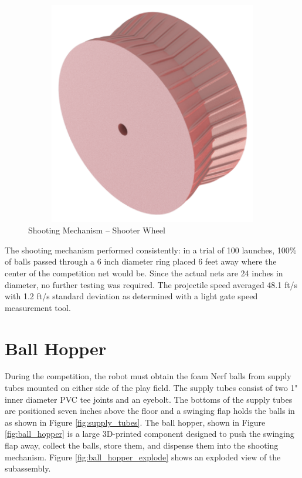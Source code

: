 \begin{figure}[H]   %
	\centering \includegraphics[width=6in, height=3.85in, keepaspectratio]{figures/shooter_wheel.png}
	\caption{Shooting Mechanism -- Shooter Wheel}	\label{fig:shooter_wheel}
\end{figure}

The shooting mechanism performed consistently: in a trial of 100 launches, 100\% of balls passed through a 6 inch diameter ring placed 6 feet away where the center of the competition net would be. Since the actual nets are 24 inches in diameter, no further testing was required. The projectile speed averaged 48.1 ft/s with 1.2 ft/s standard deviation as determined with a light gate speed measurement tool.

\section{Ball Hopper}
During the competition, the robot must obtain the foam Nerf balls from supply tubes mounted on either side of the play field. The supply tubes consist of two 1" inner diameter PVC tee joints and an eyebolt. The bottoms of the supply tubes are positioned seven inches above the floor and a swinging flap holds the balls in as shown in Figure \ref{fig:supply_tubes}. The ball hopper, shown in Figure \ref{fig:ball_hopper} is a large 3D-printed component designed to push the swinging flap away, collect the balls, store them, and dispense them into the shooting mechanism. Figure \ref{fig:ball_hopper_explode} shows an exploded view of the subassembly.

